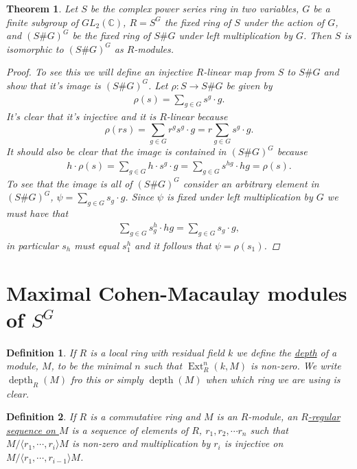 \documentclass[11pt, a4paper, english]{article}
\numberwithin{prop}{section}
\numberwithin{lemma}{section}
\newtheorem{theorem}{Theorem}
\numberwithin{theorem}{section}
\newtheorem{defin}{Definition}
\numberwithin{defin}{section}
\numberwithin{example}{section}
\newcommand{\C}{\mathbb{C}}
\DeclareMathOperator{\Ext}{Ext}
\DeclareMathOperator{\depth}{depth}
\begin{document}
\begin{theorem}
Let $S$ be the complex power series ring in two variables, $G$ be a finite subgroup of $GL_2(\C)$, $R = S^G$ the fixed ring of $S$ under the action of $G$, and $(S\#G)^G$ be the fixed ring of $S\#G$ under left multiplication by $G$. Then $S$ is isomorphic to $(S\#G)^G$ as $R$-modules.

\begin{proof}
To see this we will define an injective $R$-linear map from $S$ to $S\#G$ and show that it's image is $(S\#G)^G$. Let $\rho: S \to S\#G$ be given by
\begin{align*}
\rho(s) = \sum_{g \in G} s^g \cdot g.
\end{align*}
It's clear that it's injective and it is $R$-linear because $$\rho(rs) = \sum_{g \in G} r^gs^g \cdot g = r\sum_{g \in G} s^g \cdot g.$$ It should also be clear that the image is contained in $(S\#G)^G$ because
\begin{align*}
h \cdot \rho(s) = \sum_{g \in G} h \cdot s^g \cdot g = \sum_{g \in G} s^{hg} \cdot hg = \rho(s).
\end{align*}
To see that the image is all of $(S\#G)^G$ consider an arbitrary element in $(S\#G)^G$, $\psi = \sum_{g\in G} s_g \cdot g$. Since $\psi$ is fixed under left multiplication by $G$ we must have that
\begin{align*}
\sum_{g\in G} s_g^h \cdot hg = \sum_{g\in G} s_g \cdot g,
\end{align*}
in particular $s_h$ must equal $s_1^h$ and it follows that $\psi = \rho(s_1)$.
\end{proof}
\end{theorem}

\section{Maximal Cohen-Macaulay modules of $S^G$}
\iffalse
\begin{defin}
If $R$ is a local ring with residual field $k$ we define the \underline{depth} of a module, $M$, to be the minimal $n$ such that $\Ext^n_R(k, M)$ is non-zero. We write $\depth_R(M)$ fro this or simply $\depth(M)$ when which ring we are using is clear.
\end{defin}

\begin{defin}
\label{def:regular_seq}
If $R$ is a commutative ring and $M$ is an $R$-module, an \underline{$R$-regular sequence on $M$} is a sequence of elements of $R$, $r_1, r_2, \cdots r_n$ such that $M/\langle r_1, \cdots, r_i \rangle M$ is non-zero and multiplication by $r_i$ is injective on $M/\langle r_1, \cdots, r_{i-1} \rangle M$.
\end{defin}
\end{document}
